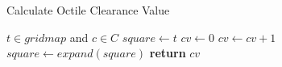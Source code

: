 \begin{algorithm}
\caption{Calculate Octile Clearance Value}
\label{aha-alg:calculateclearance}
\begin{algorithmic}
\REQUIRE $t \in gridmap$ and $c \in C$
	\STATE $square \leftarrow t$
	\STATE $cv \leftarrow 0$
		\STATE $cv \leftarrow cv + 1$
		\STATE $square \leftarrow expand(square)$
	\ENDWHILE
	\STATE \textbf{return} $cv$
\end{algorithmic}
\end{algorithm}
